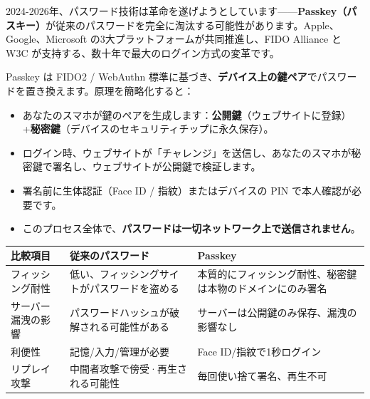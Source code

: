 
2024-2026年、パスワード技術は革命を遂げようとしています——\textbf{Passkey（パスキー）}が従来のパスワードを完全に淘汰する可能性があります。Apple、Google、Microsoft の3大プラットフォームが共同推進し、FIDO Alliance と W3C が支持する、数十年で最大のログイン方式の変革です。


Passkey は FIDO2 / WebAuthn 標準に基づき、\textbf{デバイス上の鍵ペア}でパスワードを置き換えます。原理を簡略化すると：

\begin{itemize}
  \item あなたのスマホが鍵のペアを生成します：\textbf{公開鍵}（ウェブサイトに登録）+\textbf{秘密鍵}（デバイスのセキュリティチップに永久保存）。
  \item ログイン時、ウェブサイトが「チャレンジ」を送信し、あなたのスマホが秘密鍵で署名し、ウェブサイトが公開鍵で検証します。
  \item 署名前に生体認証（Face ID / 指紋）またはデバイスの PIN で本人確認が必要です。
  \item このプロセス全体で、\textbf{パスワードは一切ネットワーク上で送信されません}。
\end{itemize}


\begin{center}
\begin{tabularx}{\linewidth}{|X|X|X|}
\hline
\textbf{比較項目} & \textbf{従来のパスワード} & \textbf{Passkey} \tabularnewline
\hline
フィッシング耐性 & 低い、フィッシングサイトがパスワードを盗める & 本質的にフィッシング耐性、秘密鍵は本物のドメインにのみ署名 \tabularnewline
サーバー漏洩の影響 & パスワードハッシュが破解される可能性がある & サーバーは公開鍵のみ保存、漏洩の影響なし \tabularnewline
利便性 & 記憶/入力/管理が必要 & Face ID/指紋で1秒ログイン \tabularnewline
リプレイ攻撃 & 中間者攻撃で傍受·再生される可能性 & 毎回使い捨て署名、再生不可 \tabularnewline
\hline
\end{tabularx}
\end{center}


